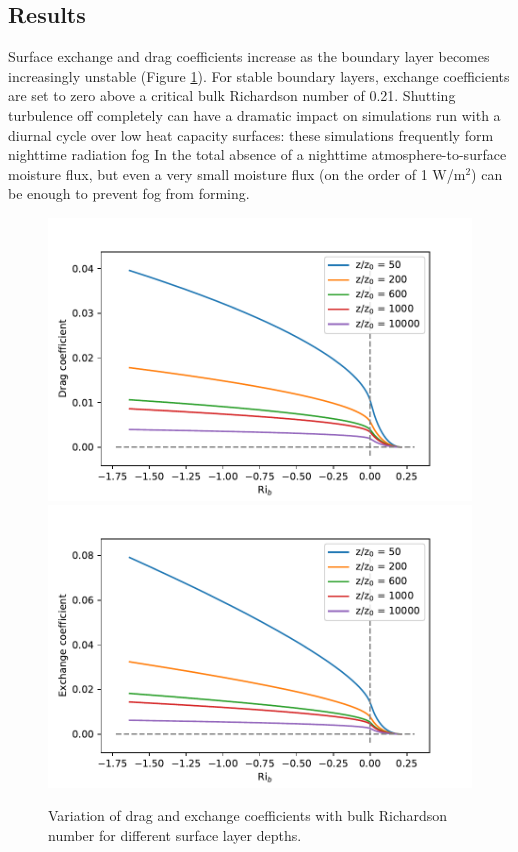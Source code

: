 \documentclass[10pt]{article}
\begin{document}
\subsection{Results}

Surface exchange and drag coefficients increase as the boundary layer becomes increasingly unstable (Figure \ref{fig:Byun4}). For stable boundary layers, exchange coefficients are set to zero above a critical bulk Richardson number of 0.21. Shutting turbulence off completely can have a dramatic impact on simulations run with a diurnal cycle over low heat capacity surfaces: these simulations frequently form nighttime radiation fog In the total absence of a nighttime atmosphere-to-surface moisture flux, but even a very small  moisture flux (on the order of 1 W/m$^2$) can be enough to prevent fog from forming.

\begin{figure}
\begin{center}
\includegraphics[height=0.4\textheight]{Byun1990Figure4a.pdf}
\includegraphics[height=0.4\textheight]{Byun1990Figure4b.pdf}
\end{center}
\caption{Variation of drag and exchange coefficients with bulk Richardson number for different surface layer depths.}
\label{fig:Byun4}
\end{figure}
\end{document}

